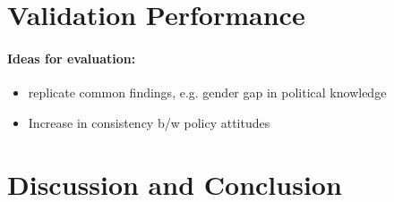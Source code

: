 \documentclass[12pt]{article}
\begin{document}
\section{Validation Performance}

\paragraph{Ideas for evaluation:}
\begin{itemize}\singlespacing
\item replicate common findings, e.g. gender gap in political knowledge \citep[e.g.][]{barabas2014question}
\item Increase in consistency b/w policy attitudes \citep[e.g.][]{prior2014visual}
\end{itemize}

\section{Discussion and Conclusion}


\clearpage\singlespacing\footnotesize


\end{document}

